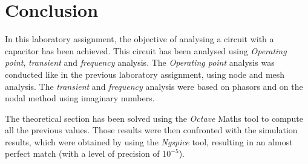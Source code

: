 \section{Conclusion}
\label{sec:conclusion}

\indent

In this laboratory assignment, the objective of analysing a circuit with a capacitor has been achieved. This circuit has been analysed using \textit{Operating point}, \textit{transient} and \textit{frequency} analysis. The \textit{Operating point} analysis was conducted like in the previous laboratory assignment, using node and mesh analysis. The \textit{transient} and \textit{frequency} analysis were based on phasors and on the nodal method using imaginary numbers.


The theoretical section has been solved using the {\em Octave} Maths tool to compute all the previous values. Those results were then confronted with the simulation results, which were obtained by using the {\em Ngspice} tool, resulting in an almost perfect match (with a level of precision of $10^{-5}$).
